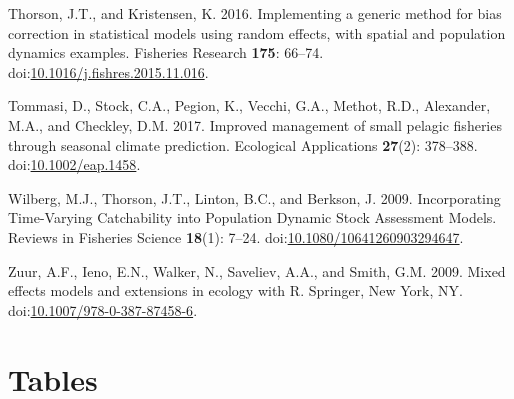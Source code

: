 \documentclass[
]{article}
\newlength{\cslhangindent}
\newlength{\cslentryspacingunit} %
\newenvironment{CSLReferences}[2] %
 {%
  \setlength{\parindent}{0pt}
  \ifodd #1
  \let\oldpar\par
  \def\par{\hangindent=\cslhangindent\oldpar}
  \fi
  \setlength{\parskip}{#2\cslentryspacingunit}
 }%
 {}
\begin{document}
\begin{CSLReferences}{1}{0}
\leavevmode{}%
Thorson, J.T., and Kristensen, K. 2016. Implementing a generic method for bias correction in statistical models using random effects, with spatial and population dynamics examples. Fisheries Research \textbf{175}: 66--74. doi:\href{https://doi.org/10.1016/j.fishres.2015.11.016}{10.1016/j.fishres.2015.11.016}.

\leavevmode{}%
Tommasi, D., Stock, C.A., Pegion, K., Vecchi, G.A., Methot, R.D., Alexander, M.A., and Checkley, D.M. 2017. Improved management of small pelagic fisheries through seasonal climate prediction. Ecological Applications \textbf{27}(2): 378--388. doi:\href{https://doi.org/10.1002/eap.1458}{10.1002/eap.1458}.

\leavevmode{}%
Wilberg, M.J., Thorson, J.T., Linton, B.C., and Berkson, J. 2009. Incorporating {Time}-{Varying} {Catchability} into {Population} {Dynamic} {Stock} {Assessment} {Models}. Reviews in Fisheries Science \textbf{18}(1): 7--24. doi:\href{https://doi.org/10.1080/10641260903294647}{10.1080/10641260903294647}.

\leavevmode{}%
Zuur, A.F., Ieno, E.N., Walker, N., Saveliev, A.A., and Smith, G.M. 2009. Mixed effects models and extensions in ecology with {R}. Springer, New York, NY. doi:\href{https://doi.org/10.1007/978-0-387-87458-6}{10.1007/978-0-387-87458-6}.

\end{CSLReferences}

\newpage

\hypertarget{tables}{%
\section{Tables}\label{tables}}

\providecommand{\docline}[3]{\noalign{\global\setlength{\arrayrulewidth}{#1}}\arrayrulecolor[HTML]{#2}\cline{#3}}

\setlength{\tabcolsep}{2pt}

\renewcommand*{\arraystretch}{1}
\end{document}
